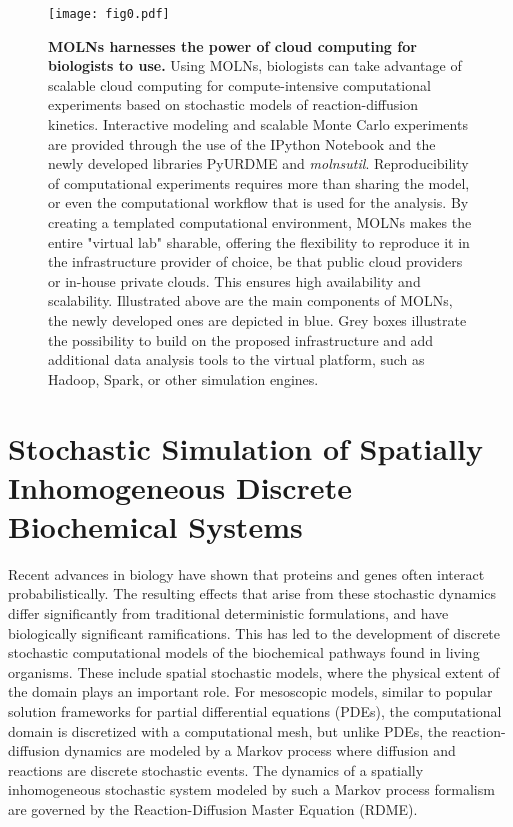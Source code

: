 \documentclass[final,leqno,onefignum,onetabnum]{siamltex1213}
\begin{document}
\begin{figure}[htpb]
\begin{center}
\texttt{[image: fig0.pdf]}
\end{center}
\caption{{\bf MOLNs harnesses the power of cloud computing for biologists to use.}
Using MOLNs, biologists can take advantage of scalable cloud computing for compute-intensive computational experiments based on stochastic models of reaction-diffusion kinetics. Interactive modeling and scalable Monte Carlo experiments are provided through the use of the IPython Notebook and the newly developed libraries PyURDME and \emph{molnsutil}. Reproducibility of computational experiments requires more than sharing the model, or even the computational workflow that is used for the analysis. By creating a templated computational environment, MOLNs makes the entire "virtual lab" sharable, offering the flexibility to reproduce it in the infrastructure provider of choice, be that public cloud providers or in-house private clouds.  This ensures high availability and scalability.
Illustrated above are the main components of MOLNs, the newly developed ones are depicted in blue. Grey boxes illustrate the possibility to build on the proposed infrastructure and add additional data analysis tools to the virtual platform, such as Hadoop, Spark, or other simulation engines. 
}
\label{fig:box1}
\end{figure}

\section{Stochastic Simulation of Spatially Inhomogeneous Discrete Biochemical Systems}
Recent advances in biology have shown that proteins and genes often interact probabilistically. The resulting effects that arise from these stochastic dynamics differ significantly from traditional deterministic formulations, and have biologically significant ramifications. This has led to the development of discrete stochastic computational models of the biochemical pathways found in living organisms. These include spatial stochastic models, where the physical extent of the domain plays an important role. For mesoscopic models, similar to popular solution frameworks for partial differential equations (PDEs), the computational domain is discretized with a computational mesh, but unlike PDEs, the reaction-diffusion dynamics are modeled by a Markov process where diffusion and reactions are discrete stochastic events.
The dynamics of a spatially inhomogeneous stochastic system modeled by such a Markov process formalism are governed by the Reaction-Diffusion Master Equation (RDME)\cite{gardiner2004handbook}.
\end{document}
